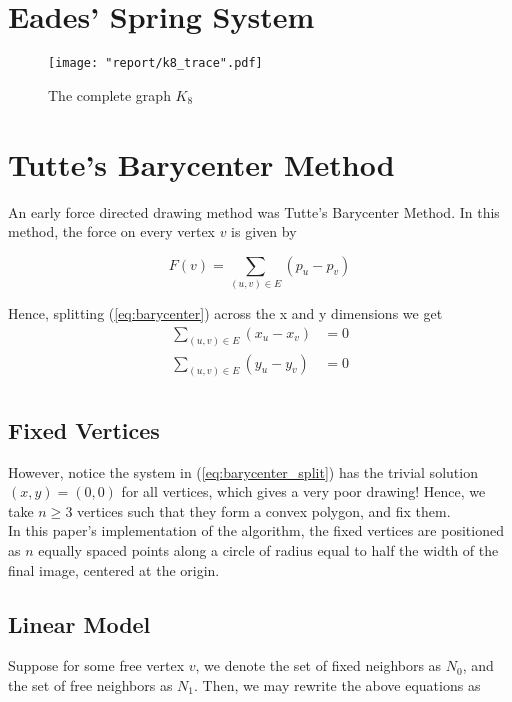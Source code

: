 \documentclass[11pt]{report}
\begin{document}
\section{Eades' Spring System}

\begin{figure}[H]
    \centering
    \texttt{[image: "report/k8\_trace".pdf]}
    \caption{The complete graph $K_8$}
\end{figure}

\section{Tutte's Barycenter Method}
An early force directed drawing method was Tutte's Barycenter Method. In this method, the force on every vertex $v$ is given by 

\begin{equation}\label{eq:barycenter}
F(v) = \sum_{(u, v) \in E} (p_u - p_v)
\end{equation}

Hence, splitting (\ref{eq:barycenter}) across the x and y dimensions we get
\begin{equation}\label{eq:barycenter_split}
    \begin{aligned}
    \sum_{(u, v) \in E} (x_u - x_v) &= 0 \\
    \sum_{(u, v) \in E} (y_u - y_v) &= 0 \\
    \end{aligned}
\end{equation}

\subsection{Fixed Vertices}
However, notice the system in (\ref{eq:barycenter_split}) has the trivial solution $(x, y) = (0, 0)$ for all vertices, which gives a very poor drawing! Hence, we take $n \geq 3$ vertices such that they form a convex polygon, and fix them. \\

In this paper's implementation of the algorithm, the fixed vertices are positioned as $n$ equally spaced points along a circle of radius equal to half the width of the final image, centered at the origin.

\subsection{Linear Model}
Suppose for some free vertex $v$, we denote the set of fixed neighbors as $N_0$, and the set of free neighbors as $N_1$. Then, we may rewrite the above equations as
\end{document}
